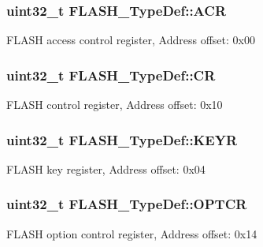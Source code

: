 \subsubsection[{\texorpdfstring{A\+CR}{ACR}}]{ uint32\+\_\+t F\+L\+A\+S\+H\+\_\+\+Type\+Def\+::\+A\+CR}\hypertarget{struct_f_l_a_s_h___type_def_aaf432a8a8948613f4f66fcace5d2e5fe}{}\label{struct_f_l_a_s_h___type_def_aaf432a8a8948613f4f66fcace5d2e5fe}
F\+L\+A\+SH access control register, Address offset\+: 0x00 
\subsubsection[{\texorpdfstring{CR}{CR}}]{ uint32\+\_\+t F\+L\+A\+S\+H\+\_\+\+Type\+Def\+::\+CR}\hypertarget{struct_f_l_a_s_h___type_def_a7919306d0e032a855200420a57f884d7}{}\label{struct_f_l_a_s_h___type_def_a7919306d0e032a855200420a57f884d7}
F\+L\+A\+SH control register, Address offset\+: 0x10 
\subsubsection[{\texorpdfstring{K\+E\+YR}{KEYR}}]{ uint32\+\_\+t F\+L\+A\+S\+H\+\_\+\+Type\+Def\+::\+K\+E\+YR}\hypertarget{struct_f_l_a_s_h___type_def_a802e9a26a89b44decd2d32d97f729dd3}{}\label{struct_f_l_a_s_h___type_def_a802e9a26a89b44decd2d32d97f729dd3}
F\+L\+A\+SH key register, Address offset\+: 0x04 
\subsubsection[{\texorpdfstring{O\+P\+T\+CR}{OPTCR}}]{ uint32\+\_\+t F\+L\+A\+S\+H\+\_\+\+Type\+Def\+::\+O\+P\+T\+CR}\hypertarget{struct_f_l_a_s_h___type_def_a54026c3b5bc2059f1b187acb6c4817ac}{}\label{struct_f_l_a_s_h___type_def_a54026c3b5bc2059f1b187acb6c4817ac}
F\+L\+A\+SH option control register, Address offset\+: 0x14 
